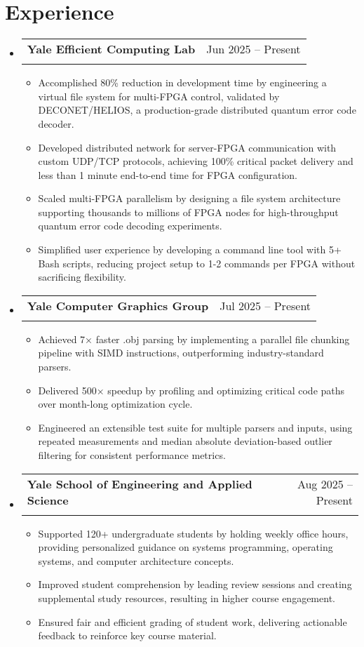 \documentclass[letterpaper,11pt]{article}
\makeatletter
\newcommand{\resumeItem}[1]{
  \item\small{
    {#1 \vspace{-2pt}}
  }
}
\newcommand{\resumeSubheading}[4]{
  \vspace{-2pt}\item
    \begin{tabular*}{0.97\textwidth}[t]{l@{\extracolsep{\fill}}r}
      \textbf{#1} & #2 \\
      \text{\small#3} & \text{\small #4} \\
    \end{tabular*}\vspace{-7pt}
}
\newcommand{\resumeSubHeadingListStart}{\begin{itemize}[leftmargin=0.15in, label={}]}
\newcommand{\resumeSubHeadingListEnd}{\end{itemize}}
\newcommand{\resumeItemListStart}{\begin{itemize}}
\newcommand{\resumeItemListEnd}{\end{itemize}\vspace{-5pt}}
\makeatother
\begin{document}
\section{Experience}
  \resumeSubHeadingListStart
    \resumeSubheading
      {Yale Efficient Computing Lab}{Jun 2025 -- Present}
      {Research Assistant (advised by Prof. Lin Zhong)}{New Haven, CT}
      \resumeItemListStart
        \resumeItem{Accomplished 80\% reduction in development time by engineering a virtual file system for multi-FPGA control, validated by DECONET/HELIOS, a production-grade distributed quantum error code decoder.}
        \resumeItem{Developed distributed network for server-FPGA communication with custom UDP/TCP protocols, achieving 100\% critical packet delivery and less than 1 minute end-to-end time for FPGA configuration.}
        \resumeItem{Scaled multi-FPGA parallelism by designing a file system architecture supporting thousands to millions of FPGA nodes for high-throughput quantum error code decoding experiments.}
        \resumeItem{Simplified user experience by developing a command line tool with 5+ Bash scripts, reducing project setup to 1-2 commands per FPGA without sacrificing flexibility.}
      \resumeItemListEnd
    \resumeSubheading
      {Yale Computer Graphics Group}{Jul 2025 -- Present}
      {Researcher (advised by Prof. Mike Shah)}{Part Time, New Haven, CT}
      \resumeItemListStart
        \resumeItem{Achieved 7× faster .obj parsing by implementing a parallel file chunking pipeline with SIMD instructions, outperforming industry-standard parsers.}
        \resumeItem{Delivered 500× speedup by profiling and optimizing critical code paths over month-long optimization cycle.}
        \resumeItem{Engineered an extensible test suite for multiple parsers and inputs, using repeated measurements and median absolute deviation-based outlier filtering for consistent performance metrics.}
      \resumeItemListEnd
    \resumeSubheading
      {Yale School of Engineering and Applied Science}{Aug 2025 -- Present}
      {Teaching Assistant (Computer Systems)}{Part Time, New Haven, CT}
      \resumeItemListStart
        \resumeItem{Supported 120+ undergraduate students by holding weekly office hours, providing personalized guidance on systems programming, operating systems, and computer architecture concepts.}
        \resumeItem{Improved student comprehension by leading review sessions and creating supplemental study resources, resulting in higher course engagement.}
        \resumeItem{Ensured fair and efficient grading of student work, delivering actionable feedback to reinforce key course material.}
      \resumeItemListEnd
  \resumeSubHeadingListEnd
\end{document}
